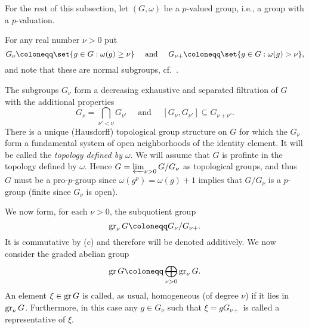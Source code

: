 For the rest of this subsection, let $(G,\omega)$ be a $p$-valued group, i.e., a group with a $p$-valuation.

For any real number $\nu>0$ put
\begin{equation*}
  G_{\nu} \coloneqq \set{g\in G : \omega(g)\geq \nu} \quad \text{ and } \quad G_{\nu+} \coloneqq \set{g\in G : \omega(g)>\nu},
\end{equation*}%
%
%
and note that these are normal subgroups, cf.\ \cite[Sect.~23]{Sch}.

The subgroups $G_{\nu}$ form a decreasing exhaustive and separated filtration of $G$ with the additional properties
\begin{equation*}
  G_{\nu} = \bigcap_{\nu'<\nu}G_{\nu'} \quad \text{ and } \quad [G_\nu,G_{\nu'}] \subseteq G_{\nu+\nu'}.
\end{equation*}
There is a unique (Hausdorff) topological group structure on $G$ for which the $G_\nu$ form a fundamental system of open neighborhoods of the identity element. It will be called the \emph{topology defined by $\omega$}. We will assume that $G$ is profinte in the topology defined by $\omega$. Hence $G = \projlim_{\nu > 0} G/G_{\nu}$ as topological groups, and thus $G$ must be a pro-$p$-group since $\omega(g^{p}) = \omega(g) + 1$ implies that $G/G_{\nu}$ is a $p$-group (finite since $G_{\nu}$ is open).

We now form, for each $\nu>0$, the subquotient group
\begin{equation*}
  \gr_\nu G \coloneqq G_\nu/G_{\nu+}.
\end{equation*}%
%
It is commutative by (c) and therefore will be denoted additively. We now consider the graded abelian group
\begin{equation*}
  \gr G \coloneqq \bigoplus_{\nu>0} \gr_\nu G.
\end{equation*}%
%
An element $\xi \in \gr G$ is called, as usual, homogeneous (of degree $\nu$) if it lies in $\gr_\nu G$. Furthermore, in this case any $g\in G_\nu$ such that $\xi = gG_{\nu+}$ is called a representative of $\xi$.

